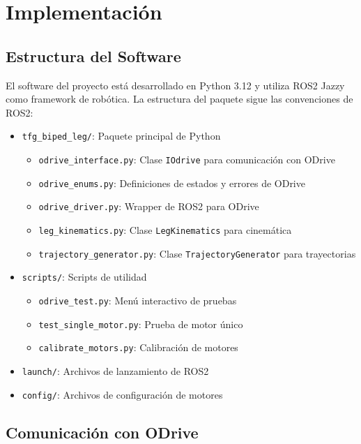 \chapter{Implementación}

\section{Estructura del Software}

El software del proyecto está desarrollado en Python 3.12 y utiliza ROS2 Jazzy como framework de robótica. La estructura del paquete sigue las convenciones de ROS2:

\begin{itemize}
    \item \texttt{tfg\_biped\_leg/}: Paquete principal de Python
    \begin{itemize}
        \item \texttt{odrive\_interface.py}: Clase \texttt{IOdrive} para comunicación con ODrive
        \item \texttt{odrive\_enums.py}: Definiciones de estados y errores de ODrive
        \item \texttt{odrive\_driver.py}: Wrapper de ROS2 para ODrive
        \item \texttt{leg\_kinematics.py}: Clase \texttt{LegKinematics} para cinemática
        \item \texttt{trajectory\_generator.py}: Clase \texttt{TrajectoryGenerator} para trayectorias
    \end{itemize}
    \item \texttt{scripts/}: Scripts de utilidad
    \begin{itemize}
        \item \texttt{odrive\_test.py}: Menú interactivo de pruebas
        \item \texttt{test\_single\_motor.py}: Prueba de motor único
        \item \texttt{calibrate\_motors.py}: Calibración de motores
    \end{itemize}
    \item \texttt{launch/}: Archivos de lanzamiento de ROS2
    \item \texttt{config/}: Archivos de configuración de motores
\end{itemize}

\section{Comunicación con ODrive}


